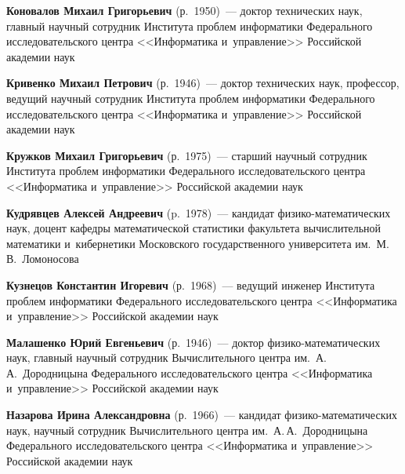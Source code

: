 \begin{multicols}{2}
\vspace*{3pt}

\noindent
\textbf{Коновалов Михаил Григорьевич} (р.\ 1950)~--- 
доктор технических наук, главный научный со\-труд\-ник Института проб\-лем 
информатики Федерального исследовательского цент\-ра <<Информатика и~управ\-ле\-ние>> 
Российской академии наук

\vspace*{3pt}


\noindent
\textbf{Кривенко Михаил Петрович} (р.\ 1946)~--- 
доктор технических наук, профессор, ведущий научный сотруд\-ник Института проб\-лем 
информатики Федерального исследовательского цент\-ра <<Информатика и~управление>> 
Российской академии наук

\vspace*{3pt}

\noindent
\textbf{Кружков Михаил Григорьевич} (р.\ 1975)~--- старший научный сотрудник Института проблем 
информатики Федерального 
исследовательского цент\-ра <<Информатика и~управ\-ле\-ние>>
 Российской академии наук
 
 \pagebreak

\noindent
\textbf{Кудрявцев Алексей Андреевич} (p.\ 1978)~--- 
кандидат фи\-зи\-ко-ма\-те\-ма\-ти\-че\-ских наук, доцент кафедры 
математической статистики факультета вычислительной математики 
и~кибернетики Московского государственного университета им.\ М.\,В.~Ломоносова

\vspace*{3pt}

\noindent
\textbf{Кузнецов Константин Игоревич} (р.\ 1968)~--- 
ведущий инженер Института проблем информатики Федерального исследовательского центра 
<<Информатика и~управ\-ле\-ние>> Российской академии наук

\vspace*{3pt}

\noindent
\textbf{Малашенко Юрий Евгеньевич} (р.\ 1946)~--- доктор фи\-зи\-ко-ма\-те\-ма\-ти\-че\-ских 
наук, главный научный со\-труд\-ник Вычислительного центра им.\ А.\,А.~Дородницына 
Федерального исследовательского цент\-ра <<Информатика и~управ\-ле\-ние>> 
Российской академии наук

\vspace*{3pt}

\noindent
\textbf{Назарова Ирина Александровна} (р.\ 1966)~--- кандидат фи\-зи\-ко-ма\-те\-ма\-ти\-че\-ских
 наук, научный со\-труд\-ник Вычислительного центра им.\ А.\,А.~Дородницына 
 Федерального исследовательского цент\-ра <<Информатика и~управ\-ле\-ние>> 
 Российской академии наук
 

\end{multicols}

